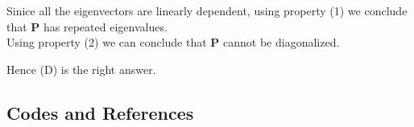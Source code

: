 \documentclass[journal,12pt,twocolumn]{IEEEtran}
\begin{document}
Sinice all the eigenvectors are linearly dependent, using property (1) we conclude that \textbf{P} has repeated eigenvalues. \\
Using property (2) we can conclude that \textbf{P} cannot be diagonalized.

Hence (D) is the right answer.





    





  
\subsection{\textbf{Codes and References}}
\end{document}
